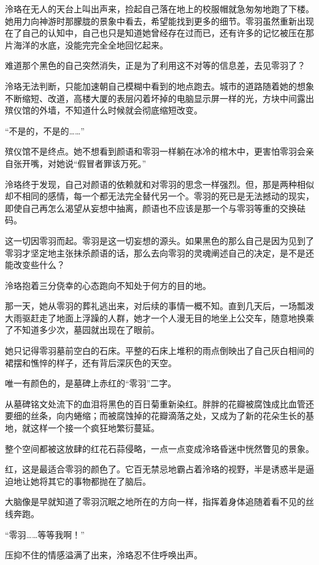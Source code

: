 \documentclass[UTF8, scheme = chinese, openany]{ctexbook}
\begin{document}
泠珞在无人的天台上叫出声来，捡起自己落在地上的校服帽就急匆匆地跑了下楼。她用力向神游时那朦胧的景象中看去，希望能找到更多的细节。零羽虽然重新出现在了自己的认知中，自己也只是知道她曾经存在过而已，还有许多的记忆被压在那片海洋的水底，没能完完全全地回忆起来。

难道那个黑色的自己突然消失，正是为了利用这不对等的信息差，去见零羽了？

泠珞无法判断，只能加速朝自己模糊中看到的地点跑去。城市的道路随着她的想象不断缩短、改道，高楼大厦的表层闪着坏掉的电脑显示屏一样的光，方块中间露出殡仪馆的外墙，不知道什么时候就会彻底缩短改变。

“不是的，不是的……”

殡仪馆不是终点。她不想看到颜语和零羽一样躺在冰冷的棺木中，更害怕零羽会亲自张开嘴，对她说“假冒者罪该万死。”

泠珞终于发现，自己对颜语的依赖就和对零羽的思念一样强烈。但，那是两种相似却不相同的感情，每一个都无法完全替代另一个。零羽的死已是无法撼动的现实，即使自己再怎么渴望从妄想中抽离，颜语也不应该是那一个与零羽等重的交换砝码。

这一切因零羽而起。零羽是这一切妄想的源头。如果黑色的那么自己是因为见到了零羽才坚定地主张抹杀颜语的话，那么去向零羽的灵魂阐述自己的决定，是不是还能改变些什么？

泠珞抱着三分侥幸的心态跑向不知处于何方的目的地。

那一天，她从零羽的葬礼逃出来，对后续的事情一概不知。直到几天后，一场瓢泼大雨驱赶走了地面上浮躁的人群，她才一个人漫无目的地坐上公交车，随意地换乘了不知道多少次，墓园就出现在了眼前。

她只记得零羽墓前空白的石床。平整的石床上堆积的雨点倒映出了自己灰白相间的裙摆和憔悴的样子，还有背后深灰色的天空。

唯一有颜色的，是墓碑上赤红的“零羽”二字。

从墓碑铭文处流下的血泪将黑色的百日菊重新染红。胖胖的花瓣被腐蚀成比血管还要细的丝条，向内蜷缩；而被腐蚀掉的花瓣滴落之处，又成为了新的花朵生长的基地，就这样一个接一个疯狂地繁衍蔓延。

整个空间都被这放肆的红花石蒜侵略，一点一点变成泠珞昏迷中恍然瞥见的景象。

红，这是最适合零羽的颜色了。它百无禁忌地霸占着泠珞的视野，半是诱惑半是逼迫地让她将其它的事物都抛在了脑后。

大脑像是早就知道了零羽沉眠之地所在的方向一样，指挥着身体追随着看不见的丝线奔跑。

“零羽……等等我啊！”

压抑不住的情感溢满了出来，泠珞忍不住呼唤出声。
\end{document}
